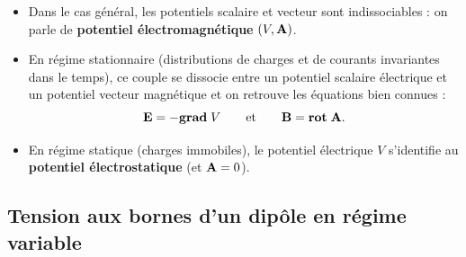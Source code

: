 \documentclass[11pt,a4paper]{report}
\begin{document}
\begin{itemize}
	\item Dans le cas général, les potentiels scalaire et vecteur sont indissociables : on parle de \textbf{potentiel électromagnétique} $(V,\bold{A})$. 
	\item En régime stationnaire (distributions de charges et de courants invariantes dans le temps), ce couple se dissocie entre un potentiel scalaire électrique et un potentiel 
		vecteur magnétique et on retrouve les équations bien connues :
	\begin{equation}
		\bold{E} = -\textbf{grad}\;V \qquad\text{et}\qquad \bold{B} = \textbf{rot}\;\bold{A}.
	\end{equation}
	\item En régime statique (charges immobiles), le potentiel électrique $V$ s'identifie au \textbf{potentiel électrostatique} (et $\bold{A} = 0$).
\end{itemize}

\subsection{Tension aux bornes d'un dipôle en régime variable}
\end{document}
